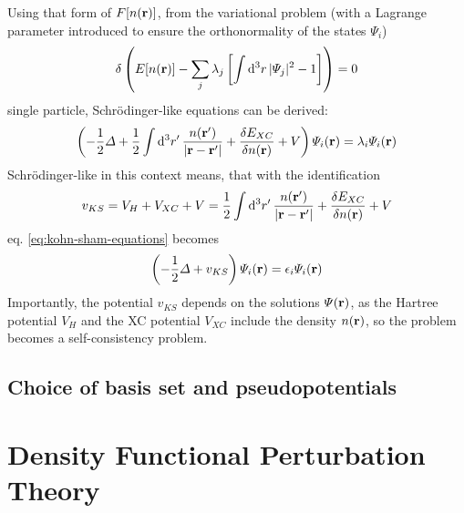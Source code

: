 \documentclass[main.tex]{subfiles}
\begin{document}
Using that form of \(F[n(\vb{r})]\), from the variational problem (with a Lagrange parameter introduced to ensure the orthonormality of the states \(\Psi_i\))
\begin{align}
     \delta \left( E [n(\vb{r})] - \sum_j \lambda_j \left[\int \dd[3]{r} \vert \Psi_j \vert^2 - 1 \right] \right) = 0
\end{align}
single particle, Schrödinger-like equations can be derived:
\begin{equation}\label{eq:kohn-sham-equations}
    \left(-\frac{1}{2} \Delta + \frac{1}{2} \int \dd[3]{r^{\prime}} \frac{n(\vb{r}^{\prime})}{\vert \vb{r} - \vb{r}^{\prime} \vert} + \fdv{E_{XC}}{n(\vb{r})} + V\right) \Psi_i (\vb{r}) = \lambda_i \Psi_i (\vb{r})
\end{equation}
Schrödinger-like in this context means, that with the identification
\begin{equation}
    v_{KS} = V_H + V_{XC} + V = \frac{1}{2} \int \dd[3]{r^{\prime}} \frac{n(\vb{r}^{\prime})}{\vert \vb{r} - \vb{r}^{\prime} \vert} + \fdv{E_{XC}}{n(\vb{r})} + V
\end{equation}
eq. \ref{eq:kohn-sham-equations} becomes
\begin{equation}
    \left(- \frac{1}{2} \Delta + v_{KS}\right) \Psi_i (\vb{r}) = \epsilon_i \Psi_i (\vb{r})
\end{equation}
Importantly, the potential \(v_{KS}\) depends on the solutions \(\Psi (\vb{r})\), as the Hartree potential \(V_H\) and the XC potential \(V_{XC}\) include the density \(n(\vb{r})\), so the problem becomes a self-consistency problem.


\subsection{Choice of basis set and pseudopotentials}



\section{Density Functional Perturbation Theory} \label{sec:theory_dfpt}

\end{document}
